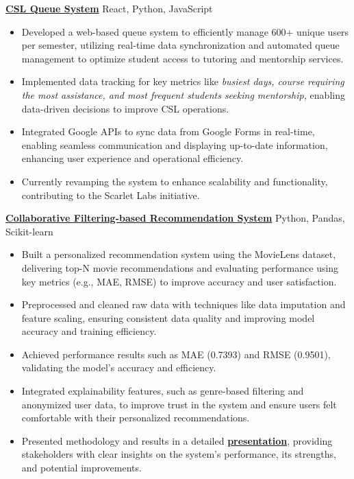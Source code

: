 \documentclass[a4paper]{article}
\begin{document}
\textbf{\href{https://github.com/Rutgers-CSL}{CSL Queue System}} \hfill React, Python, JavaScript\\
\vspace{-3mm}
\begin{itemize} \itemsep -3.5pt
    \item Developed a web-based queue system to efficiently manage 600+ unique users per semester, utilizing real-time data synchronization and automated queue management to optimize student access to tutoring and mentorship services.
    \item Implemented data tracking for key metrics like \textit{busiest days, course requiring the most assistance, and most frequent students seeking mentorship,} enabling data-driven decisions to improve CSL operations.
    \item Integrated Google APIs to sync data from Google Forms in real-time, enabling seamless communication and displaying up-to-date information, enhancing user experience and operational efficiency.
    \item Currently revamping the system to enhance scalability and functionality, contributing to the Scarlet Labs initiative.
\end{itemize}
\vspace*{-1mm}
\textbf{\href{https://github.com/ShatakshiRanjan/Recommendation-systems}{Collaborative Filtering-based Recommendation System}} \hfill Python, Pandas, Scikit-learn
\vspace{-2.5mm}
\begin{itemize} \itemsep -3.5pt
\item Built a personalized recommendation system using the MovieLens dataset, delivering top-N movie recommendations and evaluating performance using key metrics (e.g., MAE, RMSE) to improve accuracy and user satisfaction.
\item Preprocessed and cleaned raw data with techniques like data imputation and feature scaling, ensuring consistent data quality and improving model accuracy and training efficiency.
\item Achieved performance results such as MAE (0.7393) and RMSE (0.9501), validating the model's accuracy and efficiency.
\item Integrated explainability features, such as genre-based filtering and anonymized user data, to improve trust in the system and ensure users felt comfortable with their personalized recommendations.
\item Presented methodology and results in a detailed \textbf{\href{https://docs.google.com/presentation/d/1r65Cy6-eKkuGI6xonAQxm5vqnZ0_YV5kaQh9pkjvJF0/edit?usp=sharing}{presentation}}, providing stakeholders with clear insights on the system's performance, its strengths, and potential improvements.
\end{itemize}
\end{document}
